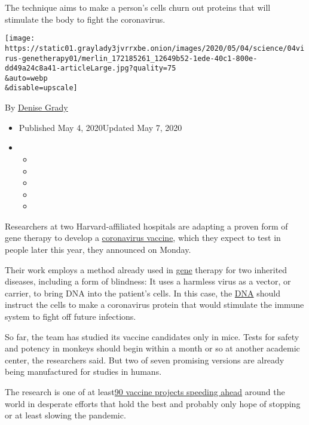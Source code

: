 The technique aims to make a person's cells churn out proteins that will
stimulate the body to fight the coronavirus.

\texttt{[image: https://static01.graylady3jvrrxbe.onion/images/2020/05/04/science/04virus-genetherapy01/merlin\_172185261\_12649b52-1ede-40c1-800e-dd49a24c8a41-articleLarge.jpg?quality=75\\\&auto=webp\\\&disable=upscale]}

By \href{https://www.nytimes3xbfgragh.onion/by/denise-grady}{Denise
Grady}

\begin{itemize}
\item
  Published May 4, 2020Updated May 7, 2020
\item
  \begin{itemize}
  \item
  \item
  \item
  \item
  \item
  \end{itemize}
\end{itemize}

Researchers at two Harvard-affiliated hospitals are adapting a proven
form of gene therapy to develop a
\href{https://www.nytimes3xbfgragh.onion/2020/05/07/health/coronavirus-vaccine-moderna.html}{coronavirus
vaccine}, which they expect to test in people later this year, they
announced on Monday.

Their work employs a method already used in
\href{https://www.nytimes3xbfgragh.onion/2020/05/06/health/coronavirus-mutation-transmission.html}{gene}
therapy for two inherited diseases, including a form of blindness: It
uses a harmless virus as a vector, or carrier, to bring DNA into the
patient's cells. In this case, the
\href{https://www.nytimes3xbfgragh.onion/2020/07/04/health/coronavirus-neanderthals.html}{DNA}
should instruct the cells to make a coronavirus protein that would
stimulate the immune system to fight off future infections.

So far, the team has studied its vaccine candidates only in mice. Tests
for safety and potency in monkeys should begin within a month or so at
another academic center, the researchers said. But two of seven
promising versions are already being manufactured for studies in humans.

The research is one of at
least\href{https://www.nytimes3xbfgragh.onion/2020/05/02/us/politics/vaccines-coronavirus-research.html}{90
vaccine projects speeding ahead} around the world in desperate efforts
that hold the best and probably only hope of stopping or at least
slowing the pandemic.

